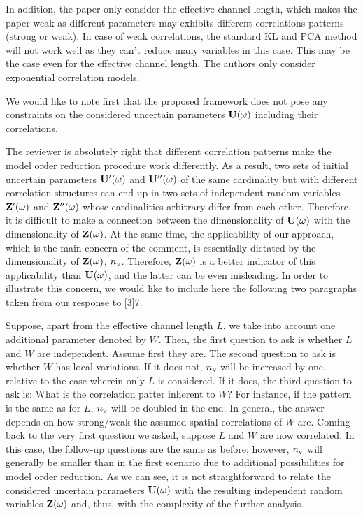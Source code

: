 \begin{reviewer}
In addition, the paper only consider the effective channel length, which makes the paper weak as different parameters may exhibits different correlations patterns (strong or weak). In case of weak correlations, the standard KL and PCA method will not work well as they can’t reduce many variables in this case. This may be the case even for the effective channel length. The authors only consider exponential correlation models.
\end{reviewer}
\begin{authors}
We would like to note first that the proposed framework does not pose any constraints on the considered uncertain parameters $\mathbf{U}(\omega)$ including their correlations.

The reviewer is absolutely right that different correlation patterns make the model order reduction procedure work differently.
As a result, two sets of initial uncertain parameters $\mathbf{U}'(\omega)$ and $\mathbf{U}''(\omega)$ of the same cardinality but with different correlation structures can end up in two sets of independent random variables $\mathbf{Z}'(\omega)$ and $\mathbf{Z}''(\omega)$ whose cardinalities arbitrary differ from each other.
Therefore, it is difficult to make a connection between the dimensionality of $\mathbf{U}(\omega)$ with the dimensionality of $\mathbf{Z}(\omega)$.
At the same time, the applicability of our approach, which is the main concern of the comment, is essentially dictated by the dimensionality of $\mathbf{Z}(\omega)$, ${n_\text{v}}$.
Therefore, $\mathbf{Z}(\omega)$ is a better indicator of this applicability than $\mathbf{U}(\omega)$, and the latter can be even misleading.
In order to illustrate this concern, we would like to include here the following two paragraphs taken from our response to \cref{3}{7}.

Suppose, apart from the effective channel length $L$, we take into account one additional parameter denoted by $W$.
Then, the first question to ask is whether $L$ and $W$ are independent.
Assume first they are.
The second question to ask is whether $W$ has local variations.
If it does not, ${n_\text{v}}$ will be increased by one, relative to the case wherein only $L$ is considered.
If it does, the third question to ask is: What is the correlation patter inherent to $W$?
For instance, if the pattern is the same as for $L$, ${n_\text{v}}$ will be doubled in the end.
In general, the answer depends on how strong/weak the assumed spatial correlations of $W$ are.
Coming back to the very first question we asked, suppose $L$ and $W$ are now correlated.
In this case, the follow-up questions are the same as before; however, ${n_\text{v}}$ will generally be smaller than in the first scenario due to additional possibilities for model order reduction.
As we can see, it is not straightforward to relate the considered uncertain parameters $\mathbf{U}(\omega)$ with the resulting independent random variables $\mathbf{Z}(\omega)$ and, thus, with the complexity of the further analysis.


\end{authors}
